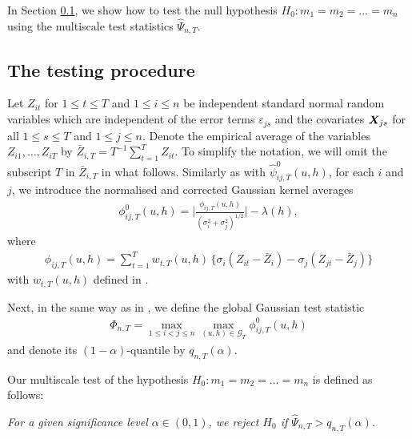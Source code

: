 \documentclass[a4paper,12pt]{article}
\makeatletter
\renewcommand{\eqref}[1]{\tagform@{\ref{#1}}}
\makeatother
\begin{document}
In Section \ref{subsec:test:test}, we show how to test the null hypothesis $H_0: m_1 =m_2 = \ldots = m_n$ using the multiscale test statistics $\widehat{\Psi}_{n,T}$.

\subsection{The testing procedure}\label{subsec:test:test}


Let $Z_{it}$ for $1 \le t \le T$ and $1 \le i \le n$ be independent standard normal random variables which are independent of the error terms $\varepsilon_{js}$ and the covariates $\boldsymbol{X}_{js}$ for all $1 \leq s \leq T $ and $1 \leq j \leq n$. Denote the empirical average of the variables $Z_{i1},\ldots, Z_{iT}$ by $\bar{Z}_{i,T} = T^{-1} \sum_{t=1}^T Z_{it}$. To simplify the notation, we will omit the subscript $T$ in $\bar{Z}_{i,T}$ in what follows. Similarly as with $\hat{\psi}^0_{ij, T}(u, h)$, for each $i$ and $j$, we introduce the normalised and corrected Gaussian kernel averages 
\begin{align}\label{eq:phi_zero_ij}
\phi^0_{ij, T}(u, h) =  \bigg|\frac{\phi_{ij, T}(u, h)}{(\sigma_i^2 + \sigma_j^2)^{1/2}}\bigg| - \lambda(h),
\end{align}
where 
\begin{align}\label{eq:phi_ij}
\phi_{ij, T}(u, h) = \sum\nolimits_{t=1}^T w_{t,T}(u, h) \, \big\{ \sigma_i (Z_{it} - \bar{Z}_i) - \sigma_j (Z_{jt} - \bar{Z}_j) \big\}
\end{align}
with $w_{t, T}(u, h)$ defined in \eqref{eq:weights}. 

Next, in the same way as in \eqref{eq:Psi_hat}, we define the global Gaussian test statistic
\begin{align}\label{eq:Phi}
\Phi_{n,T} = \max_{1 \le i < j \le n}\max_{(u, h) \in \mathcal{G}_T} \phi^0_{ij, T}(u, h)
\end{align}
and denote its $(1-\alpha)$-quantile by $q_{n,T}(\alpha)$.

Our multiscale test of the hypothesis $H_0: m_1 = m_2 = \ldots = m_n$ is defined as follows: 
\begin{center}
\begin{minipage}[c][0.75cm][c]{13cm}
\textit{For a given significance level $\alpha \in (0,1)$, we reject $H_0$ if $\widehat{\Psi}_{n,T} > q_{n,T}(\alpha)$.}
\end{minipage}
\end{center}
\end{document}
